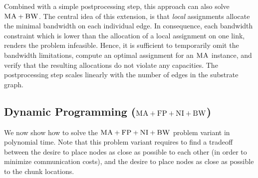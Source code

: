 \documentclass[conference,10pt]{IEEEtran}
\newcommand{\CC}{\textsc{NI}}
\newcommand{\FP}{\textsc{FP}}
\newcommand{\BW}{\textsc{BW}}
\newcommand{\MA}{\textsc{MA}}
\begin{document}
Combined with a simple postprocessing step, this approach can also solve $\MA+\BW$. The central idea of this extension, is
that \emph{local} assignments allocate the minimal bandwidth
on each individual edge. In consequence, each bandwidth constraint
which is lower than the allocation of a local assignment on one link, renders
the problem infeasible. Hence, it is sufficient to temporarily omit the
bandwidth limitations, compute an optimal assignment for an $\MA$ instance, and
verify that the resulting allocations do not violate any capacities. The
postprocessing step scales linearly with the number of edges in the substrate
graph.



\subsection{Dynamic Programming ($\MA+\FP+\CC+\BW$)}\label{ssec:dyn}

We now show how to solve the $\MA+\FP+\CC+\BW$ problem variant
in polynomial time.
Note that this problem variant requires to find a
tradeoff between the desire to place nodes as close as possible to each other
(in order to minimize communication costs), and the desire to place nodes
as close as possible to
the chunk locations.
\end{document}
